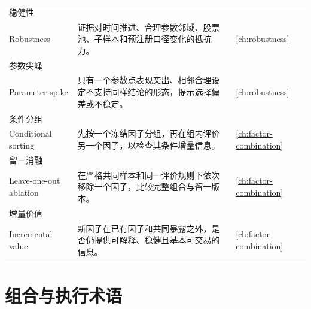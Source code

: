 \begin{longtable}{@{}p{3.2cm}p{9.0cm}p{2.8cm}@{}}
稳健性\\Robustness & 证据对时间推进、合理参数邻域、股票池、子样本和预注册口径变化的抵抗力。 & \cref{ch:robustness} \\
参数尖峰\\Parameter spike & 只有一个参数点表现突出、相邻合理设定不支持同样结论的形态，提示选择偏差或不稳定。 & \cref{ch:robustness} \\
条件分组\\Conditional sorting & 先按一个冻结因子分组，再在组内评价另一个因子，以检查其条件增量信息。 & \cref{ch:factor-combination} \\
留一消融\\Leave-one-out ablation & 在严格共同样本和同一评价规则下依次移除一个因子，比较完整组合与留一版本。 & \cref{ch:factor-combination} \\
增量价值\\Incremental value & 新因子在已有因子和共同暴露之外，是否仍提供可解释、稳健且基本可交易的信息。 & \cref{ch:factor-combination} \\
\bottomrule
\end{longtable}
\endgroup

\section{组合与执行术语}

